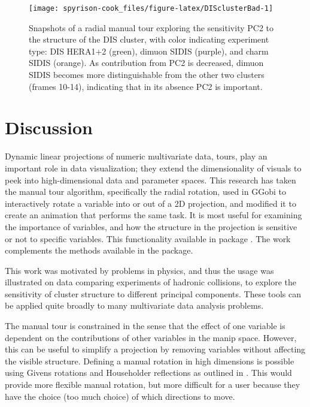 \begin{Schunk}
\begin{figure}

{\centering \texttt{[image: spyrison-cook\_files/figure-latex/DISclusterBad-1]} 

}

\caption[Snapshots of a radial manual tour exploring the sensitivity PC2 to the structure of the DIS cluster, with color indicating experiment type]{Snapshots of a radial manual tour exploring the sensitivity PC2 to the structure of the DIS cluster, with color indicating experiment type: DIS HERA1+2 (green), dimuon SIDIS (purple), and charm SIDIS (orange). As contribution from PC2 is decreased, dimuon SIDIS becomes more distinguishable from the other two clusters (frames 10-14), indicating that in its absence PC2 is important.}\label{fig:DISclusterBad}
\end{figure}
\end{Schunk}

\hypertarget{sec:discussion}{%
\section{Discussion}\label{sec:discussion}}

Dynamic linear projections of numeric multivariate data, tours, play an
important role in data visualization; they extend the dimensionality of
visuals to peek into high-dimensional data and parameter spaces. This
research has taken the manual tour algorithm, specifically the radial
rotation, used in GGobi \citep{swayne_ggobi:_2003} to interactively
rotate a variable into or out of a 2D projection, and modified it to
create an animation that performs the same task. It is most useful for
examining the importance of variables, and how the structure in the
projection is sensitive or not to specific variables. This functionality
available in package . The work complements the methods
available in the  package.

This work was motivated by problems in physics, and thus the usage was
illustrated on data comparing experiments of hadronic collisions, to
explore the sensitivity of cluster structure to different principal
components. These tools can be applied quite broadly to many
multivariate data analysis problems.

The manual tour is constrained in the sense that the effect of one
variable is dependent on the contributions of other variables in the
manip space. However, this can be useful to simplify a projection by
removing variables without affecting the visible structure. Defining a
manual rotation in high dimensions is possible using Givens rotations
and Householder reflections as outlined in
\citet{buja_computational_2005}. This would provide more flexible manual
rotation, but more difficult for a user because they have the choice
(too much choice) of which directions to move.

